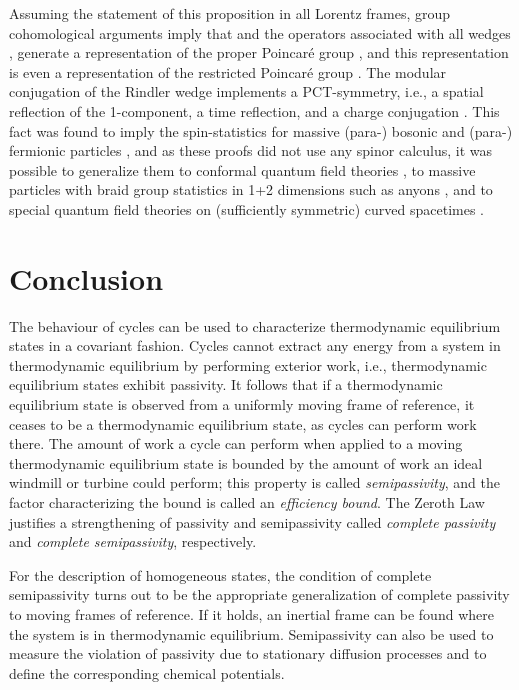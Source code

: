\documentclass[a4paper,11pt]{article}
\def\E{{\cal E}}
\def\P{{\cal P}}
\def\Halmos{\quad\hfill\myHighlight{$\Box$}\coordHE{}}
\def\pct{P\myHighlight{$_1$}\coordHE{}CT}
\begin{document}
\Halmos

Assuming the statement of this proposition in all Lorentz frames,
group cohomological arguments imply that
\coordHE{} and the operators \coordHE{} associated with all wedges \coordHE{},
generate a representation
of the proper Poincar\'e group \myHighlight{$\P_+$}\coordHE{} \cite{BGL93}, and
this representation is even a representation
of the restricted Poincar\'e group \myHighlight{$\P_+^\uparrow$}\coordHE{} \cite{GL95}. The
modular conjugation of the Rindler wedge implements a
\pct-symmetry, i.e., a spatial reflection of the 1-component, a
time reflection, and a charge conjugation \cite{GL95}.
This fact was found to imply the spin-statistics for massive
(para-) bosonic and (para-) fermionic particles
\cite{GL95,Kuc95}, and as these proofs did not use any
spinor calculus, it was possible to generalize them to
conformal quantum field theories \cite{GL96}, to
massive particles with braid group statistics in 1+2 dimensions
such as anyons \cite{Lon97,Mun98}, and to special quantum field theories
on (sufficiently symmetric) curved spacetimes \cite{GLRV}.



\section{Conclusion}\label{conclusion}

The behaviour of cycles can be used to characterize thermodynamic
equilibrium states in a covariant fashion.  Cycles
cannot extract any energy from a
system in thermodynamic equilibrium
by performing exterior work, i.e., thermodynamic equilibrium states
exhibit passivity. It
follows that if a thermodynamic equilibrium state is observed from a
uniformly moving frame of reference, it ceases to be a thermodynamic
equilibrium state, as cycles can perform work there. The amount of work
a cycle can perform when applied to a moving thermodynamic equilibrium
state is bounded by the amount of work an ideal windmill or turbine
could perform; this property is called {\em semipassivity}, and the
factor \myHighlight{$\E\geq0$}\coordHE{} characterizing the bound is called an {\em efficiency
bound}. The Zeroth Law justifies a strengthening of passivity and
semipassivity called {\em complete passivity} and {\em complete
semipassivity}, respectively.

For the description of homogeneous states, the condition of complete
semipassivity turns out to be the appropriate generalization of
complete passivity to moving frames of reference. If it holds, an
inertial frame can be found where the system is in thermodynamic
equilibrium. Semipassivity can also be used to measure the violation
of passivity due to stationary diffusion processes and to define
the corresponding chemical potentials.
\end{document}
